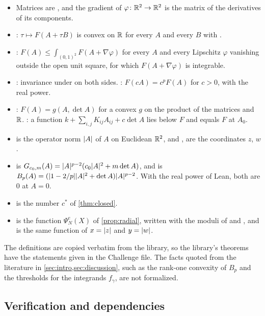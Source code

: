 {\sloppy
\begin{itemize}
\item Matrices are , and the gradient of
  $\varphi\colon\mathbb{R}^2\to\mathbb{R}^2$ is the matrix  of the derivatives of its
  components.
\item {}: $\tau\mapsto F(A+\tau B)$ is convex on $\mathbb{R}$ for every $A$ and
  every $B$ with .
\item {}: $F(A)\le\int_{(0,1)^2}F(A+\nabla\varphi)$ for every $A$ and every
  Lipschitz $\varphi$ vanishing outside the open unit square, for which $F(A+\nabla\varphi)$ is
  integrable.
\item {}: invariance under
   on both sides. :
  $F(cA)=c^pF(A)$ for $c>0$, with the real power.
\item {}: $F(A)=g(A,\det A)$ for a convex $g$ on the product of the matrices
  and $\mathbb{R}$. : a function
  $k+\sum_{i,j}K_{ij}A_{ij}+c\det A$ lies below $F$ and equals $F$ at $A_0$.
\item {} is the operator norm $\lvert A\rvert$ of $A$ on Euclidean $\mathbb{R}^2$, and
  ,  are the coordinates $z$, $w$.
\item {} is $G_{c_0,m}(A)=\lvert A\rvert^{p-2}(c_0\lvert A\rvert^2+m\det A)$,
  and  is $B_p(A)=(\lvert 1-2/p\rvert\lvert A\rvert^2+\det A)\lvert A\rvert^{p-2}$. With the real
  power of Lean, both are $0$ at $A=0$.
\item {} is the number $c^\ast$ of \cref{thm:closed}.
\item {} is the function $\Psi^e_N(X)$ of \cref{prop:radial}, written with the
  moduli of  and , and
   is the same function of $x=\lvert z\rvert$ and $y=\lvert w\rvert$.
\end{itemize}\par}
The definitions are copied verbatim from the library, so the library's theorems have the
statements given in the Challenge file. The facts quoted from the literature in
\cref{sec:intro,sec:discussion}, such as the rank-one convexity of $B_p$ and the thresholds for
the integrands $f_\gamma$, are not formalized.

\subsection{Verification and dependencies}\label{app:formal-check}

